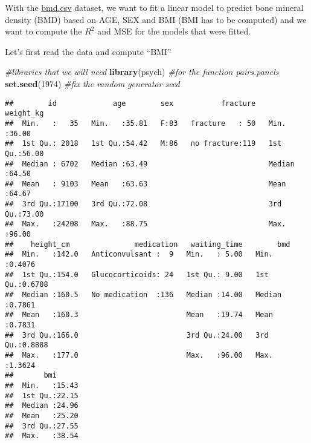 \documentclass[
]{book}
\newenvironment{Shaded}{\begin{snugshade}}{\end{snugshade}}
\newcommand{\AttributeTok}[1]{\textcolor[rgb]{0.13,0.29,0.53}{#1}}
\newcommand{\CommentTok}[1]{\textcolor[rgb]{0.56,0.35,0.01}{\textit{#1}}}
\newcommand{\ConstantTok}[1]{\textcolor[rgb]{0.56,0.35,0.01}{#1}}
\newcommand{\DecValTok}[1]{\textcolor[rgb]{0.00,0.00,0.81}{#1}}
\newcommand{\FunctionTok}[1]{\textcolor[rgb]{0.13,0.29,0.53}{\textbf{#1}}}
\newcommand{\NormalTok}[1]{#1}
\newcommand{\OtherTok}[1]{\textcolor[rgb]{0.56,0.35,0.01}{#1}}
\newcommand{\SpecialCharTok}[1]{\textcolor[rgb]{0.81,0.36,0.00}{\textbf{#1}}}
\newcommand{\StringTok}[1]{\textcolor[rgb]{0.31,0.60,0.02}{#1}}
\begin{document}
With the \href{https://www.dropbox.com/s/7wjsfdaf0wt2kg2/bmd.csv?dl=1}{bmd.csv} dataset, we want to fit a linear model to predict
bone mineral density (BMD) based on AGE, SEX and BMI (BMI has to be computed)
and we want to compute the \(R^2\) and MSE for the models that were fitted.

Let's first read the data and compute ``BMI''

\begin{Shaded}
\begin{Highlighting}[]
\CommentTok{\#libraries that we will need}
\FunctionTok{library}\NormalTok{(psych) }\CommentTok{\#for the function pairs.panels}
\FunctionTok{set.seed}\NormalTok{(}\DecValTok{1974}\NormalTok{) }\CommentTok{\#fix the random generator seed }
\end{Highlighting}
\end{Shaded}

\begin{Shaded}
\end{Shaded}

\begin{verbatim}
##        id             age        sex           fracture     weight_kg    
##  Min.   :   35   Min.   :35.81   F:83   fracture   : 50   Min.   :36.00  
##  1st Qu.: 2018   1st Qu.:54.42   M:86   no fracture:119   1st Qu.:56.00  
##  Median : 6702   Median :63.49                            Median :64.50  
##  Mean   : 9103   Mean   :63.63                            Mean   :64.67  
##  3rd Qu.:17100   3rd Qu.:72.08                            3rd Qu.:73.00  
##  Max.   :24208   Max.   :88.75                            Max.   :96.00  
##    height_cm               medication   waiting_time        bmd        
##  Min.   :142.0   Anticonvulsant :  9   Min.   : 5.00   Min.   :0.4076  
##  1st Qu.:154.0   Glucocorticoids: 24   1st Qu.: 9.00   1st Qu.:0.6708  
##  Median :160.5   No medication  :136   Median :14.00   Median :0.7861  
##  Mean   :160.3                         Mean   :19.74   Mean   :0.7831  
##  3rd Qu.:166.0                         3rd Qu.:24.00   3rd Qu.:0.8888  
##  Max.   :177.0                         Max.   :96.00   Max.   :1.3624  
##       bmi       
##  Min.   :15.43  
##  1st Qu.:22.15  
##  Median :24.96  
##  Mean   :25.20  
##  3rd Qu.:27.55  
##  Max.   :38.54
\end{verbatim}
\end{document}
